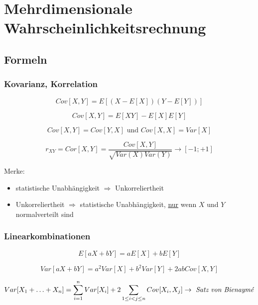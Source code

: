 \section{Mehrdimensionale Wahrscheinlichkeitsrechnung}

\subsection{Formeln}

\subsubsection{Kovarianz, Korrelation}
\begin{equation*}
    Cov[X,Y]=E[(X-E[X])(Y-E[Y])]
\end{equation*}

\begin{equation*}
    Cov[X,Y]=E[XY]-E[X]E[Y]
\end{equation*}

\begin{equation*}
    Cov[X,Y]=Cov[Y,X] \text{ und } Cov[X,X]=Var[X]
\end{equation*}

\begin{equation*}
    r_{XY} = Cor[X,Y]=\frac{Cov[X,Y]}{\sqrt{Var(X)Var(Y)}} \rightarrow [-1;+1]
\end{equation*}

Merke: 
\begin{itemize}
    \item statistische Unabhängigkeit \(\Rightarrow\) Unkorreliertheit
    \item Unkorreliertheit \(\Rightarrow\) statistische Unabhängigkeit, \underline{nur} wenn \(X\) und \(Y\) normalverteilt sind
\end{itemize}

\subsubsection{Linearkombinationen}
\begin{equation*}
    E[aX+bY]=aE[X]+bE[Y]
\end{equation*}

\begin{equation*}
    Var[aX+bY]=a^2Var[X]+b^2Var[Y]+2abCov[X,Y]
\end{equation*}

\begin{equation*}
    Var[X_1 + \hdots + X_n]=\sum_{i=1}^{n}Var[X_i] + 2\sum_{1\leq i<j\leq n}Cov[X_i,X_j] \rightarrow\text{ \emph{Satz von Bienaymé}}
\end{equation*}

